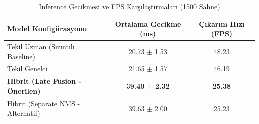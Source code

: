 \begin{table}[htbp]
\caption{Inference Gecikmesi ve FPS Karşılaştırmaları (1500 Sahne)}
\label{tab:inference_speed_1500}
\centering
\begin{tabular}{lcc}
\hline
\textbf{Model Konfigürasyonu} & \textbf{Ortalama Gecikme (ms)} & \textbf{Çıkarım Hızı (FPS)} \\ \hline
Tekil Uzman (Sızıntılı Baseline) & 20.73 $\pm$ 1.53 & 48.23 \\
Tekil Genelci & 21.65 $\pm$ 1.57 & 46.19 \\
\textbf{Hibrit (Late Fusion - Önerilen)} & \textbf{39.40 $\pm$ 2.32} & \textbf{25.38} \\
Hibrit (Separate NMS - Alternatif) & 39.63 $\pm$ 2.00 & 25.23 \\
\hline
\end{tabular}
\end{table}
